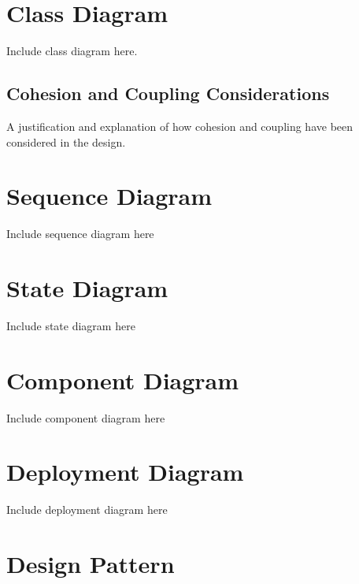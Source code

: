 \documentclass[
  english,
  a4paper,
,tablecaptionabove
]{scrartcl}
\begin{document}
\newpage

\hypertarget{class-diagram}{%
\section{Class Diagram}\label{class-diagram}}

Include class diagram here.

\hypertarget{cohesion-and-coupling-considerations}{%
\subsection{Cohesion and Coupling
Considerations}\label{cohesion-and-coupling-considerations}}

A justification and explanation of how cohesion and coupling have been
considered in the design.

\newpage

\hypertarget{sequence-diagram}{%
\section{Sequence Diagram}\label{sequence-diagram}}

Include sequence diagram here

\newpage

\hypertarget{state-diagram}{%
\section{State Diagram}\label{state-diagram}}

Include state diagram here

\newpage

\hypertarget{component-diagram}{%
\section{Component Diagram}\label{component-diagram}}

Include component diagram here

\hypertarget{deployment-diagram}{%
\section{Deployment Diagram}\label{deployment-diagram}}

Include deployment diagram here

\newpage

\hypertarget{design-pattern}{%
\section{Design Pattern}\label{design-pattern}}
\end{document}
